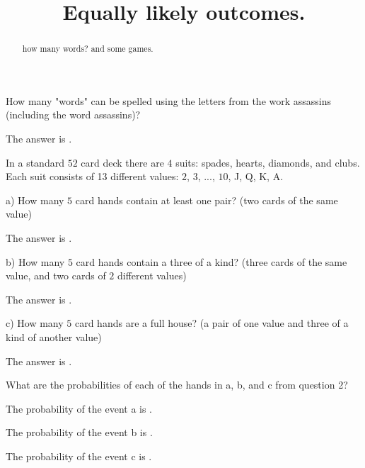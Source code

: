 \documentclass{ximera}
\title{Equally likely outcomes.}
\begin{document}
\begin{abstract}
how many words? and some games.
\end{abstract}
\maketitle

\begin{question}
How many "words" can be spelled using the letters from the work assassins (including the word assassins)?
     \begin{solution}
           The answer is .
     \end{solution}
\end{question}

\begin{question}
In a standard $52$ card deck there are $4$ suits:  spades, hearts, diamonds, and clubs.  Each suit consists of 13 different values:  $2$, $3$, ..., $10$, J, Q, K, A. 

a)  How many $5$ card hands contain at least one pair?  (two cards of the same value)
     \begin{solution}
           The answer is .
     \end{solution}
     
b)  How many $5$ card hands contain a three of a kind?  (three cards of the same value, and two cards of $2$ different values)
     \begin{solution}
           The answer is .
     \end{solution}
     
c)  How many $5$ card hands are a full house?  (a pair of one value and three of a kind of another value)
     \begin{solution}
           The answer is .
     \end{solution}
\end{question}

\begin{question}
What are the probabilities of each of the hands in a, b, and c from question 2?
     \begin{solution}
           The probability of the event a is .
     \end{solution}
      \begin{solution}
           The probability of the event b is .
     \end{solution}
      \begin{solution}
           The probability of the event c is .
     \end{solution}
\end{question}
\end{document}

